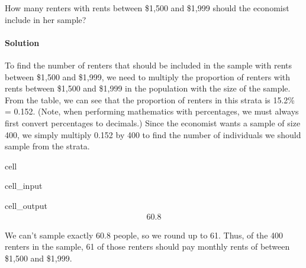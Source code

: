 \documentclass[letterpaper,10pt,english]{jupyterBook}
\begin{document}
\sphinxAtStartPar
How many renters with rents between \$1,500 and \$1,999 should the economist include in her sample?


\paragraph{Solution}
\label{\detokenize{Ch1 Sampling and Data/1.3 Sampling Techniques:id11}}
\sphinxAtStartPar
To find the number of renters that should be included in the sample with rents between \$1,500 and \$1,999, we need to multiply the proportion of renters with rents between \$1,500 and \$1,999 in the population with the size of the sample. From the table, we can see that the proportion of renters in this strata is 15.2\% = 0.152. (Note, when performing mathematics with percentages, we must always first convert percentages to decimals.) Since the economist wants a sample of size 400, we simply multiply 0.152 by 400 to find the number of individuals we should sample from the strata.

\begin{sphinxuseclass}{cell}\begin{sphinxVerbatimInput}

\begin{sphinxuseclass}{cell_input}
\begin{sphinxVerbatim}[commandchars=\\\{\}]
\end{sphinxVerbatim}

\end{sphinxuseclass}\end{sphinxVerbatimInput}
\begin{sphinxVerbatimOutput}

\begin{sphinxuseclass}{cell_output}\begin{equation*}
\begin{split}60.8\end{split}
\end{equation*}
\end{sphinxuseclass}\end{sphinxVerbatimOutput}

\end{sphinxuseclass}
\sphinxAtStartPar
We can’t sample exactly 60.8 people, so we round up to 61. Thus, of the 400 renters in the sample, 61 of those renters should pay monthly rents of between \$1,500 and \$1,999.
\end{document}
